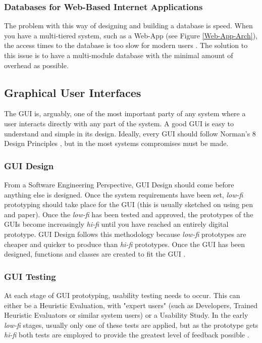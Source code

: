 \documentclass[review]{cmpreport}
\begin{document}
	\subsubsection{Databases for Web-Based Internet Applications}
	The problem with this way of designing and building a database is speed. When you have a multi-tiered system, such as a Web-App (see Figure \ref{Web-App-Arch}), the access times to the database is too slow for modern users \citep{WebAppDatabase}. The solution to this issue is to have a multi-module database with the minimal amount of overhead as possible. 

	\subsection{Graphical User Interfaces} \label{GUIs}
	The GUI is, arguably, one of the most important party of any system where a user interacts directly with any part of the system. A good GUI is easy to understand and simple in its design. Ideally, every GUI should follow Norman's 8 Design Principles \citep{Norman}, but in the most systems compromises must be made. 
	
	\subsubsection{GUI Design}
	From a Software Engineering Perspective, GUI Design should come before anything else is designed. Once the system requirements have been set, \emph{low-fi} prototyping should take place for the GUI (this is usually sketched on using pen and paper). Once the \emph{low-fi} has been tested and approved, the prototypes of the GUIs become increasingly \emph{hi-fi} until you have reached an entirely digital prototype. GUI Design follows this methodology because \emph{low-fi} prototypes are cheaper and quicker to produce than \emph{hi-fi} prototypes. Once the GUI has been designed, functions and classes are created to fit the GUI \citep{GUIDesign}. 
	
	\subsubsection{GUI Testing}
	At each stage of GUI prototyping, usability testing needs to occur. This can either be a Heuristic Evaluation, with "expert users" (such as Developers, Trained Heuristic Evaluators or similar system users) or a Usability Study. In the early \emph{low-fi} stages, usually only one of these tests are applied, but as the prototype gets \emph{hi-fi} both tests are employed to provide the greatest level of feedback possible \citep{GUIDesign}.
	
\end{document}
